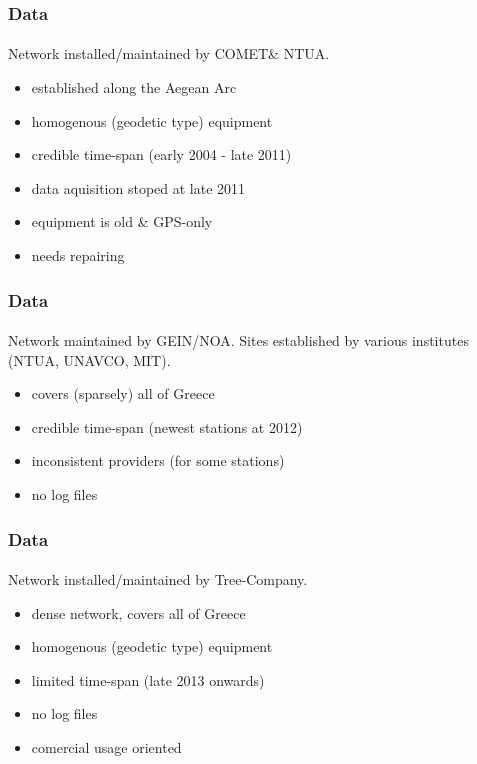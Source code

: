 \documentclass{beamer}
\begin{document}
\begin{frame}\frametitle{Data}\framesubtitle{}
  Network installed/maintained by COMET\footnotemark  \& NTUA.
  \begin{itemize}
    \item<pro@1-> established along the Aegean Arc
    \item<pro@1-> homogenous (geodetic type) equipment
    \item<pro@1-> credible time-span (early 2004 - late 2011)
    \item<con@1-> data aquisition stoped at late 2011
    \item<con@1-> equipment is old \& GPS-only
    \item<con@1-> needs repairing
  \end{itemize}
\end{frame}

\begin{frame}\frametitle{Data}\framesubtitle{}
  Network maintained by GEIN/NOA\footnotemark. Sites established by various institutes
  (NTUA, UNAVCO, MIT).
  \begin{itemize}
    \item<pro@1-> covers (sparsely) all of Greece 
    \item<pro@1-> credible time-span (newest stations at 2012)
    \item<con@1-> inconsistent providers (for some stations)
    \item<con@1-> no log files
  \end{itemize}
\end{frame}

\begin{frame}\frametitle{Data}\framesubtitle{}
  Network installed/maintained by Tree-Company\footnotemark.
  \begin{itemize}
    \item<pro@1-> dense network, covers all of Greece
    \item<pro@1-> homogenous (geodetic type) equipment
    \item<con@1-> limited time-span (late 2013 onwards)
    \item<con@1-> no log files
    \item<con@1-> comercial usage oriented
  \end{itemize}
\end{frame}
\end{document}
